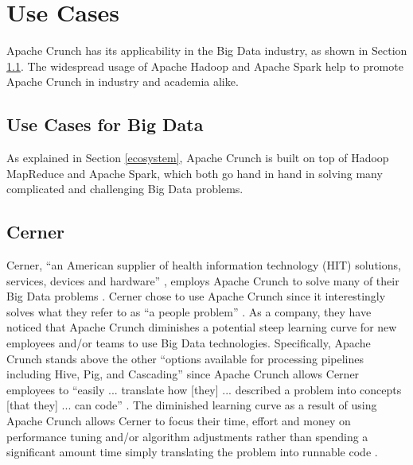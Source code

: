 \documentclass[9pt,twocolumn,twoside]{../../styles/osajnl}
\begin{document}
\section{Use Cases} \label{use}
Apache Crunch has its applicability in the Big Data industry, as shown
in Section \ref{big}. The widespread usage of Apache Hadoop and Apache
Spark help to promote Apache Crunch in industry and academia alike.

\subsection{Use Cases for Big Data} \label{big}
As explained in Section \ref{ecosystem}, Apache Crunch is built on top
of Hadoop MapReduce and Apache Spark, which both go hand in hand in
solving many complicated and challenging Big Data problems.

\subsection{Cerner} \label{cerner}
Cerner, ``an American supplier of health information technology (HIT)
solutions, services, devices and hardware'' \cite{www-cerner}, employs
Apache Crunch to solve many of their Big Data problems
\cite{www-crunch-cerner}. Cerner chose to use Apache Crunch since it
interestingly solves what they refer to as ``a people problem''
\cite{www-crunch-cerner}. As a company, they have noticed that Apache
Crunch diminishes a potential steep learning curve for new employees
and/or teams to use Big Data technologies. Specifically, Apache Crunch
stands above the other ``options available for processing pipelines
including Hive, Pig, and Cascading'' since Apache Crunch allows Cerner
employees to ``easily ... translate how [they] ... described a problem
into concepts [that they] ... can code'' \cite{www-crunch-cerner}. The
diminished learning curve as a result of using Apache Crunch allows
Cerner to focus their time, effort and money on performance tuning
and/or algorithm adjustments rather than spending a significant amount
time simply translating the problem into runnable code
\cite{www-crunch-cerner}.
\end{document}
